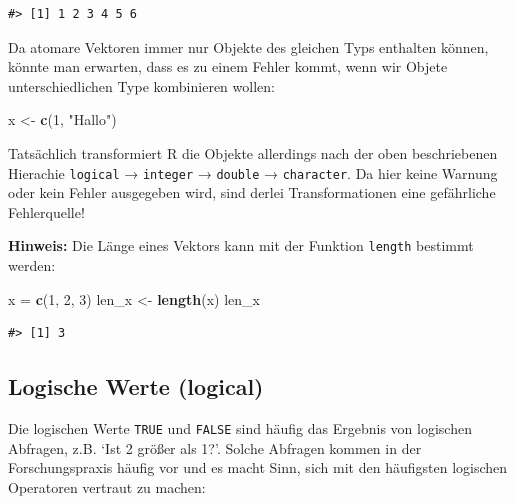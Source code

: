 \documentclass[]{tufte-book}
\newenvironment{Shaded}{}{}
\newcommand{\KeywordTok}[1]{\textcolor[rgb]{0.00,0.44,0.13}{\textbf{#1}}}
\newcommand{\DecValTok}[1]{\textcolor[rgb]{0.25,0.63,0.44}{#1}}
\newcommand{\StringTok}[1]{\textcolor[rgb]{0.25,0.44,0.63}{#1}}
\newcommand{\NormalTok}[1]{#1}
\begin{document}
\begin{verbatim}
#> [1] 1 2 3 4 5 6
\end{verbatim}

Da atomare Vektoren immer nur Objekte des gleichen Typs enthalten
können, könnte man erwarten, dass es zu einem Fehler kommt, wenn wir
Objete unterschiedlichen Type kombinieren wollen:

\begin{Shaded}
\begin{Highlighting}[]
\NormalTok{x <-}\StringTok{ }\KeywordTok{c}\NormalTok{(}\DecValTok{1}\NormalTok{, }\StringTok{"Hallo"}\NormalTok{)}
\end{Highlighting}
\end{Shaded}

Tatsächlich transformiert R die Objekte allerdings nach der oben
beschriebenen Hierachie \texttt{logical} → \texttt{integer} →
\texttt{double} → \texttt{character}. Da hier keine Warnung oder kein
Fehler ausgegeben wird, sind derlei Transformationen eine gefährliche
Fehlerquelle!

\textbf{Hinweis:} Die Länge eines Vektors kann mit der Funktion
\texttt{length} bestimmt werden:

\begin{Shaded}
\begin{Highlighting}[]
\NormalTok{x =}\StringTok{ }\KeywordTok{c}\NormalTok{(}\DecValTok{1}\NormalTok{, }\DecValTok{2}\NormalTok{, }\DecValTok{3}\NormalTok{)}
\NormalTok{len_x <-}\StringTok{ }\KeywordTok{length}\NormalTok{(x)}
\NormalTok{len_x}
\end{Highlighting}
\end{Shaded}

\begin{verbatim}
#> [1] 3
\end{verbatim}

\subsection{Logische Werte (logical)}\label{logische-werte-logical}

Die logischen Werte \texttt{TRUE} und \texttt{FALSE} sind häufig das
Ergebnis von logischen Abfragen, z.B. `Ist 2 größer als 1?'. Solche
Abfragen kommen in der Forschungspraxis häufig vor und es macht Sinn,
sich mit den häufigsten logischen Operatoren vertraut zu machen:
\end{document}
